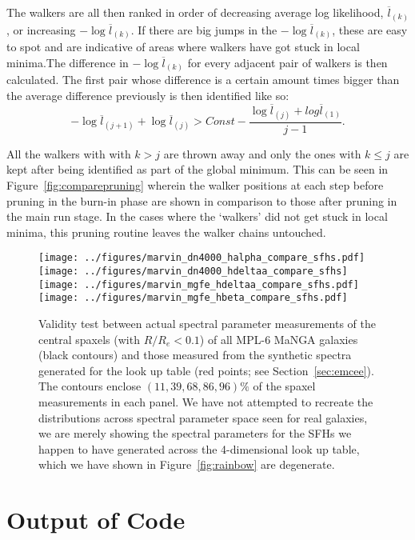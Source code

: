 \documentclass[useAMS,usenatbib]{mn2e}
\begin{document}
The walkers are all then ranked in order of decreasing average log likelihood, $\overline{l}_{(k)}$, or increasing $- \log \overline{l}_{(k)}$. If there are big jumps in the $- \log \overline{l}_{(k)}$, these are easy to spot and are indicative of areas where walkers have got stuck in local minima.The difference in $- \log \overline{l}_{(k)}$ for every adjacent pair of walkers is then calculated. The first pair whose difference is a certain amount times bigger than the average difference previously is then identified like so:
\begin{equation}
-\log \overline{l}_{(j+1)} + \log \overline{l}_{(j)} > Const − \frac{\log \overline{l}_{(j)} + log \overline{l}_{(1)}}{j - 1}.
\end{equation}



All the walkers with with $k>j$ are thrown away and only the ones with $k \leq j$ are kept after being identified as part of the global minimum. This can be seen in Figure~\ref{fig:comparepruning} wherein the walker positions at each step before pruning in the burn-in phase are shown in comparison to those after pruning in the main run stage. In the cases where the `walkers' did not get stuck in local minima, this pruning routine leaves the walker chains untouched. 

\begin{figure*}
\centering
\texttt{[image: ../figures/marvin\_dn4000\_halpha\_compare\_sfhs.pdf]}
\texttt{[image: ../figures/marvin\_dn4000\_hdeltaa\_compare\_sfhs]}
\texttt{[image: ../figures/marvin\_mgfe\_hdeltaa\_compare\_sfhs.pdf]}
\texttt{[image: ../figures/marvin\_mgfe\_hbeta\_compare\_sfhs.pdf]}
\caption{Validity test between actual spectral parameter measurements of the central spaxels (with $R/R_e < 0.1$) of all MPL-6 MaNGA galaxies (black contours) and those measured from the synthetic spectra generated for the look up table (red points; see Section~\ref{sec:emcee}). The contours enclose $(11, 39, 68, 86, 96)\%$ of the spaxel measurements in each panel. We have not attempted to recreate the distributions across spectral parameter space seen for real galaxies, we are merely showing the spectral parameters for the SFHs we happen to have generated across the 4-dimensional look up table, which we have shown in Figure~\ref{fig:rainbow} are degenerate.}
\label{fig:compare_manga_specmeas}
\end{figure*}

\section{Output of Code}\label{sec:output}
\end{document}
